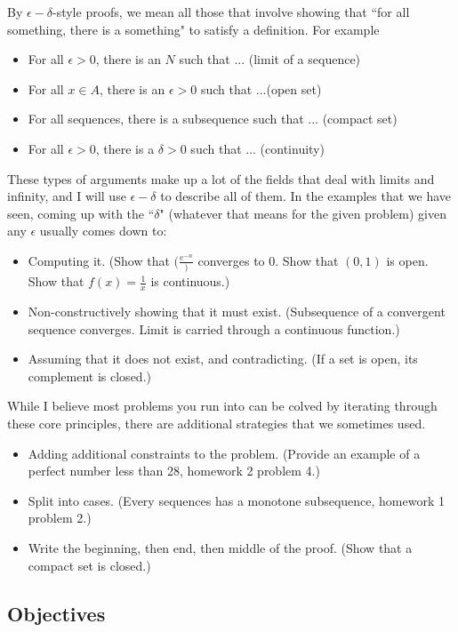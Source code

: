 \documentclass[11pt]{article}
\newcommand{\e}{\epsilon}
\theoremstyle{plain}
\theoremstyle{definition}
\theoremstyle{remark}
\begin{document}
By $\e-\delta$-style proofs, we mean all those that involve showing that ``for all something, there is a something" to satisfy a definition. For example
\begin{itemize}
    \item For all $\e > 0$, there is an $N$ such that ... (limit of a sequence)
    \item For all $x \in A$,  there is an $\e > 0$ such that ...(open set)
    \item For all sequences, there is a subsequence such that ... (compact set)
    \item For all $\e > 0$, there is a $\delta > 0$ such that ... (continuity)
\end{itemize}
These types of arguments make up a lot of the fields that deal with limits and infinity, and I will use $\e-\delta$ to describe all of them. In the examples that we have seen, coming up with the ``$\delta$" (whatever that means for the given problem) given any $\e$ usually comes down to:
\begin{itemize}
    \item Computing it. (Show that $(\frac{e^{-n}})$ converges to 0. Show that $(0, 1)$ is open. Show that $f(x) = \frac{1}{x}$ is continuous.)
    \item Non-constructively showing that it must exist. (Subsequence of a convergent sequence converges. Limit is carried through a continuous function.)
    \item Assuming that it does not exist, and contradicting. (If a set is open, its complement is closed.)
\end{itemize}
While I believe most problems you run into can be colved by iterating through these core principles, there are additional strategies that we sometimes used.
\begin{itemize}
    \item Adding additional constraints to the problem. (Provide an example of a perfect number less than 28, homework 2 problem 4.)
    \item Split into cases. (Every sequences has a monotone subsequence, homework 1 problem 2.)
    \item Write the beginning, then end, then middle of the proof. (Show that a compact set is closed.)
\end{itemize}

\subsection*{Objectives}
\end{document}
